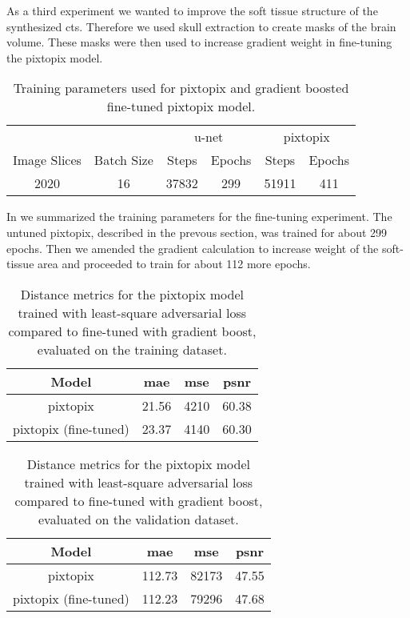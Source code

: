 As a third experiment we wanted to improve the soft tissue structure of the
synthesized \gls{ct}s. Therefore we used skull extraction to create masks of
the brain volume. These masks were then used to increase gradient weight in
fine-tuning the pixtopix model.
\begin{table}[h]
  \centering
  \begin{tabular}{cccccc}
    \toprule
    & &
    \multicolumn{2}{c}{u-net} &
    \multicolumn{2}{c}{pixtopix} \\
    Image Slices & Batch Size & Steps & Epochs & Steps & Epochs \\
    \midrule
    \num{2020} & \num{16} & \num{37832} & \num{299} & \num{51911} & \num{411} \\
    \bottomrule
  \end{tabular}
  \caption{Training parameters used for pixtopix and gradient boosted
    fine-tuned pixtopix model.
  }\label{tab:pixtopix:params}
\end{table}
In  we summarized the training parameters for the
fine-tuning experiment. The untuned pixtopix, described in the prevous section,
was trained for about \num{299} epochs. Then we amended the gradient
calculation to increase weight of the soft-tissue area and proceeded to train
for about \num{112} more epochs.
\begin{table}[h]
  \centering
  \begin{tabular}{cccc}
    \toprule
    Model & \acrshort{mae} & \acrshort{mse} & \acrshort{psnr} \\
    \midrule
    pixtopix & \num{21.56} & \num{4210} & \num{60.38} \\
    pixtopix (fine-tuned) & \num{23.37} & \num{4140} & \num{60.30} \\
    \bottomrule
  \end{tabular}
  \caption{Distance metrics for the pixtopix model trained with least-square
    adversarial loss compared to fine-tuned with gradient boost, evaluated on
    the training dataset.
  }\label{tab:pixtopix:training}
\end{table}
\begin{table}[h]
  \centering
  \begin{tabular}{cccc}
    \toprule
    Model & \acrshort{mae} & \acrshort{mse} & \acrshort{psnr} \\
    \midrule
    pixtopix & \num{112.73} & \num{82173} & \num{47.55} \\
    pixtopix (fine-tuned) & \num{112.23} & \num{79296} & \num{47.68} \\
    \bottomrule
  \end{tabular}
  \caption{Distance metrics for the pixtopix model trained with least-square
    adversarial loss compared to fine-tuned with gradient boost, evaluated on
    the validation dataset.
  }\label{tab:pixtopix:validation}
\end{table}
